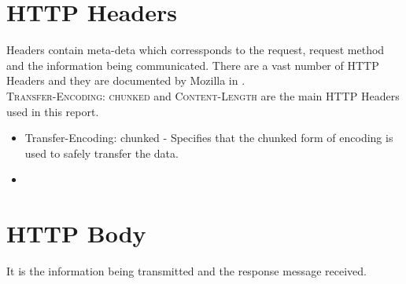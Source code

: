 \section{HTTP Headers}
Headers contain meta-deta which corressponds to the request, request method and the information being communicated. There are a vast number of HTTP Headers and they are documented by Mozilla in \cite{b17}.\\
\textsc{Transfer-Encoding: chunked} and \textsc{Content-Length} are the main HTTP Headers used in this report. \\
\begin{itemize}
	\item Transfer-Encoding: chunked - Specifies that the chunked form of encoding is used to safely transfer the data.
	\item 
\end{itemize}
\section{HTTP Body}
It is the information being transmitted and the response message received.